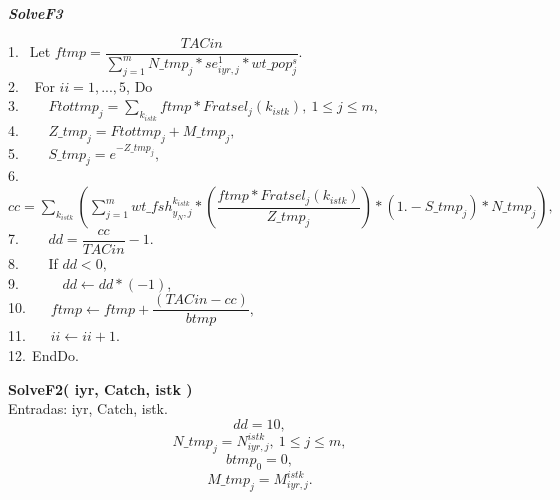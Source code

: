 \documentclass{article}
\begin{document}
 \begin{algorithm}[H]
	\caption{{\bf \textit{SolveF3}}}
	1. $\  \ $Let $ftmp=\dfrac{TACin}{\sum_{j=1}^mN\_tmp_j*se^1_{iyr,j}*wt\_pop^s_j}$. \\
    2. $\  \ $ For $ii=1,...,5$, Do \\
	3. $\  \ \quad$   $Ftottmp_j= \sum_{k_{istk}}ftmp*Fratsel_j(k_{istk}), \ 1\leq j \leq m,$\\
	4. $\  \ \quad$  $Z\_tmp_j=Ftottmp_j+M\_tmp_j,$\\
	5. $\  \ \quad$ $S\_tmp_j=e^{-Z\_tmp_j},$\\
    6. $\  \ \quad$ $cc=\sum_{k_{istk}}\left(\sum_{j=1}^m wt\_fsh^{k_{istk}}_{y_N,j}*\left(\dfrac{ftmp*Fratsel_j(k_{istk})}{Z\_tmp_j}\right)*(1.-S\_tmp_j)*N\_tmp_j\right),$\\
    7. $\  \ \quad$ $dd=\dfrac{cc}{TACin}-1.$\\
    8. $\  \ \quad$  If  $dd<0,$\\
    9. $\  \ \qquad$   $dd \leftarrow dd * (-1)$,\\
    10.$\  \ \quad$   $ftmp \leftarrow ftmp + \dfrac{(TACin-cc)}{btmp},$\\
    11.$\  \ \quad$   $ii \leftarrow ii+1.$\\
    12.$\  \ $EndDo.
    
\end{algorithm}








\textbf{SolveF2( iyr, Catch, istk )}\\
Entradas: iyr, Catch, istk.
\begin{equation}
    dd=10,
\end{equation}
\begin{equation}
    N\_tmp_j = N^{istk}_{iyr,j}, \ 1\leq j \leq m,
\end{equation}
\begin{equation}
    btmp_0=0,
\end{equation}
\begin{equation}
    M\_tmp_j=M^{istk}_{iyr,j}.
\end{equation}
\end{document}
